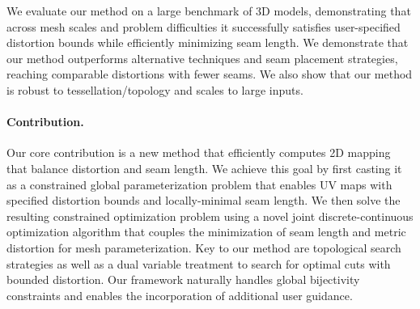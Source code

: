 We evaluate our method on a large benchmark of 3D models, demonstrating that across mesh scales and problem difficulties it successfully satisfies user-specified distortion bounds while efficiently minimizing seam length. We demonstrate that our method outperforms alternative techniques and seam placement strategies, reaching comparable distortions with fewer seams. We also show that our method is robust to tessellation/topology and scales to large inputs.%

\paragraph{Contribution.}
Our core contribution is a new method that efficiently computes 2D mapping that balance distortion and seam length. We achieve this goal by first casting it as a constrained global parameterization problem that enables UV maps with specified distortion bounds and locally-minimal seam length. 
We then solve the resulting constrained optimization problem using a novel  joint discrete-continuous optimization algorithm that couples the minimization of seam length and metric distortion for mesh parameterization. 
Key to our method are topological search strategies as well as a dual variable treatment to search for optimal cuts with bounded distortion. Our framework naturally handles global bijectivity constraints and enables the incorporation of additional user guidance.

